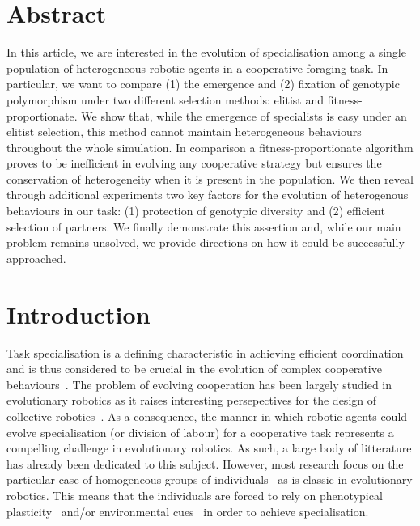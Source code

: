 \section{Abstract}
  In this article, we are interested in the evolution of specialisation among a single population of heterogeneous robotic agents in a cooperative foraging task. In particular, we want to compare (1) the emergence and (2) fixation of genotypic polymorphism under two different selection methods: elitist and fitness-proportionate. We show that, while the emergence of specialists is easy under an elitist selection, this method cannot maintain heterogeneous behaviours throughout the whole simulation. In comparison a fitness-proportionate algorithm proves to be inefficient in evolving any cooperative strategy but ensures the conservation of heterogeneity when it is present in the population. We then reveal through additional experiments two key factors for the evolution of heterogenous behaviours in our task: (1) protection of genotypic diversity and (2) efficient selection of partners. We finally demonstrate this assertion and, while our main problem remains unsolved, we provide directions on how it could be successfully approached.


\section{Introduction}
  Task specialisation is a defining characteristic in achieving efficient coordination and is thus considered to be crucial in the evolution of complex cooperative behaviours~\parencite{Eors1995}. The problem of evolving cooperation has been largely studied in evolutionary robotics as it raises interesting persepectives for the design of collective robotics~\parencite{Trianni2007, Hauert2014, Doncieux2015a}. As a consequence, the manner in which robotic agents could evolve specialisation (or division of labour) for a cooperative task represents a compelling challenge in evolutionary robotics. As such, a large body of litterature has already been dedicated to this subject. However, most research focus on the particular case of homogeneous groups of individuals~\parencite{Waibel2009} as is classic in evolutionary robotics. This means that the individuals are forced to rely on phenotypical plasticity~\parencite{Waibel2006, Ferrante2015, Eskridge2015} and/or environmental cues~\parencite{Waibel2006, Goldsby2010} in order to achieve specialisation.

